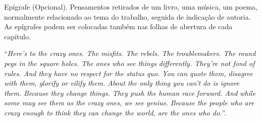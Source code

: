 \begin{epigrafe}
	
	\vspace*{\fill}
	Epígrafe (Opcional). Pensamentos retirados de um livro, uma música, um poema, normalmente relacionado ao tema do trabalho, seguida de indicação de autoria. As epígrafes podem ser colocadas também nas folhas de abertura de cada capítulo.  
    
	\epigraph{``\emph{Here's to the crazy ones. The misfits. The rebels. The troublemakers. The round pegs in the square holes. The ones who see things differently. They're not fond of rules. And they have no respect for the status quo. You can quote them, disagree with them, glorify or vilify them. About the only thing you can't do is ignore them. Because they change things. They push the human race forward. And while some may see them as the crazy ones, we see genius. Because the people who are crazy enough to think they can change the world, are the ones who do.}''.}{}
	
\end{epigrafe}
